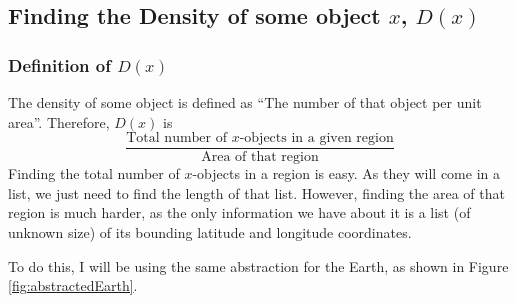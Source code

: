 \documentclass[12pt]{report}
\begin{document}
\subsection{Finding the Density of some object $x$, $D\left(x\right)$}\label{sec:dx}
\subsubsection{Definition of $D\left(x\right)$}
The density of some object is defined as ``The number of that object per unit area''. Therefore, $D\left(x\right)$ is
\begin{equation}
    \frac{\text{Total number of }x\text{-objects in a given region}}{\text{Area of that region}}
\end{equation}
Finding the total number of $x$-objects in a region is easy. As they will come in a list, we just need to find the length of that list. However, finding the area of that region is much harder, as the only information we have about it is a list (of unknown size) of its bounding latitude and longitude coordinates.

To do this, I will be using the same abstraction for the Earth, as shown in Figure \ref{fig:abstractedEarth}.
\end{document}

